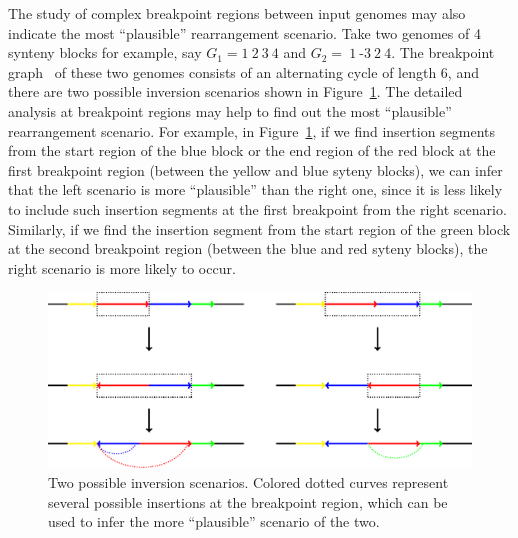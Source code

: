 \documentclass[12pt]{article}
\begin{document}
The study of complex breakpoint regions between input genomes 
may also indicate the most ``plausible'' rearrangement scenario. 
Take two genomes of 4 synteny blocks for example, say $G_1 = 1~2~3~4$ and $G_2 = ~1~$-$3~2~4$.
The breakpoint graph~\cite{bafna1993} of these two genomes consists of an alternating cycle of length 6, 
and there are two possible inversion scenarios shown in Figure~\ref{example}. 
The detailed analysis at breakpoint regions may help to find out the most ``plausible'' rearrangement scenario.
For example, in Figure~\ref{example}, if we find insertion segments from the start region of the blue block 
or the end region of the red block at the first breakpoint region (between the yellow and blue syteny blocks),
we can infer that the left scenario is more ``plausible'' than the right one, 
since it is less likely to include such insertion segments at the first breakpoint from the right scenario. Similarly, 
if we find the insertion segment from the start region of the green block 
at the second breakpoint region (between the blue and red syteny blocks), the right scenario is more likely to occur.
\begin{figure}[H]
\begin{center}
\includegraphics[width=1.0\textwidth]{example.eps}
\caption{Two possible inversion scenarios. Colored dotted curves represent several possible insertions 
at the breakpoint region, which can be used to infer the more ``plausible'' scenario of the two.}
\label{example}
\end{center}
\end{figure}




\end{document}

